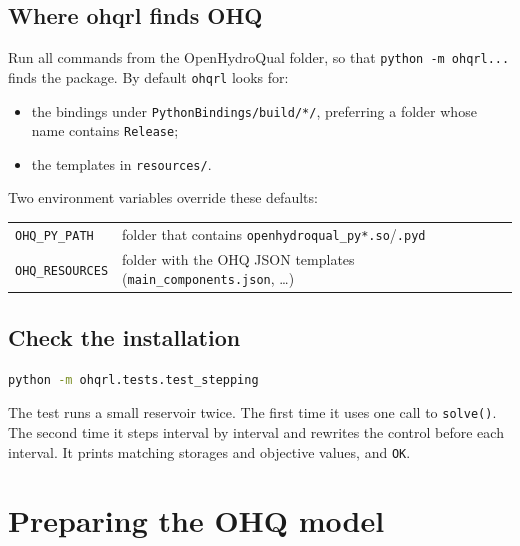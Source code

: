 \documentclass[11pt]{article}
\newcommand{\code}[1]{\texttt{#1}}
\begin{document}
\subsection{Where ohqrl finds OHQ}
Run all commands from the OpenHydroQual folder, so that \code{python -m
ohqrl...} finds the package. By default \code{ohqrl} looks for:
\begin{itemize}[nosep]
\item the bindings under \code{PythonBindings/build/*/}, preferring a
  folder whose name contains \code{Release};
\item the templates in \code{resources/}.
\end{itemize}
Two environment variables override these defaults:
\begin{center}\small
\begin{tabular}{@{}ll@{}}
\toprule
\code{OHQ\_PY\_PATH} & folder that contains \code{openhydroqual\_py*.so}/\code{.pyd}\\
\code{OHQ\_RESOURCES} & folder with the OHQ JSON templates (\code{main\_components.json}, \ldots)\\
\bottomrule
\end{tabular}
\end{center}

\subsection{Check the installation}
\begin{lstlisting}[language=bash]
python -m ohqrl.tests.test_stepping
\end{lstlisting}
The test runs a small reservoir twice. The first time it uses one call to
\code{solve()}. The second time it steps interval by interval and rewrites
the control before each interval. It prints matching storages and
objective values, and \code{OK}.

\section{Preparing the OHQ model}
\label{sec:model}
\end{document}
